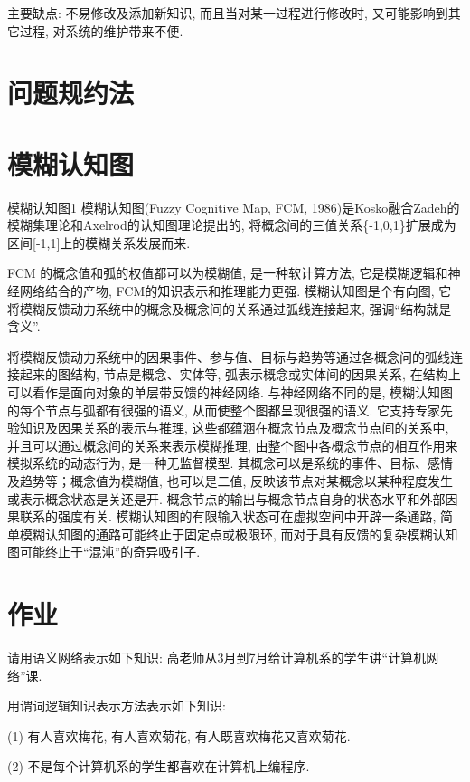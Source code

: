 主要缺点: 不易修改及添加新知识, 而且当对某一过程进行修改时, 又可能影响到其它过程, 对系统的维护带来不便.
\section{问题规约法}
\section{模糊认知图}
\begin{mydef}{模糊认知图}{1}
模糊认知图(Fuzzy Cognitive Map, FCM, 1986)是Kosko融合Zadeh的模糊集理论和Axelrod的认知图理论提出的, 将概念间的三值关系\{-1,0,1\}扩展成为区间[-1,1]上的模糊关系发展而来.
\end{mydef}
FCM 的概念值和弧的权值都可以为模糊值, 是一种软计算方法, 它是模糊逻辑和神经网络结合的产物, FCM的知识表示和推理能力更强.
模糊认知图是个有向图, 它将模糊反馈动力系统中的概念及概念间的关系通过弧线连接起来, 强调“结构就是含义”.

将模糊反馈动力系统中的因果事件、参与值、目标与趋势等通过各概念问的弧线连接起来的图结构, 节点是概念、实体等, 弧表示概念或实体间的因果关系, 在结构上可以看作是面向对象的单层带反馈的神经网络. 与神经网络不同的是, 模糊认知图的每个节点与弧都有很强的语义, 从而使整个图都呈现很强的语义. 它支持专家先验知识及因果关系的表示与推理, 这些都蕴涵在概念节点及概念节点间的关系中, 并且可以通过概念间的关系来表示模糊推理, 由整个图中各概念节点的相互作用来模拟系统的动态行为, 是一种无监督模型. 其概念可以是系统的事件、目标、感情及趋势等；概念值为模糊值, 也可以是二值, 反映该节点对某概念以某种程度发生或表示概念状态是关还是开. 概念节点的输出与概念节点自身的状态水平和外部因果联系的强度有关. 模糊认知图的有限输入状态可在虚拟空间中开辟一条通路, 简单模糊认知图的通路可能终止于固定点或极限环, 而对于具有反馈的复杂模糊认知图可能终止于“混沌”的奇异吸引子.
\section{作业}

\begin{think}
请用语义网络表示如下知识: 高老师从3月到7月给计算机系的学生讲“计算机网络”课.
\end{think}

\begin{observe}
用谓词逻辑知识表示方法表示如下知识:

(1) 有人喜欢梅花, 有人喜欢菊花, 有人既喜欢梅花又喜欢菊花.

(2) 不是每个计算机系的学生都喜欢在计算机上编程序.
\end{observe}

